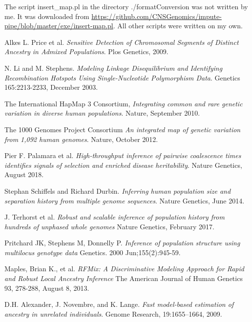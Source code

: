 \documentclass{article}
\begin{document}
The script insert\_map.pl in the directory ./formatConversion was not written by me. It was downloaded from \url{https://github.com/CNSGenomics/impute-pipe/blob/master/exe/insert-map.pl}. All other scripts were written on my own.

\begin{thebibliography}{9}
Alkes L. Price et al.
\textit{Sensitive Detection of Chromosomal Segments of Distinct Ancestry in Admixed Populations}. 
Plos Genetics, 2009.
 
N. Li and M. Stephens. 
\textit{Modeling Linkage Disequilibrium and Identifying Recombination Hotspots Using Single-Nucleotide Polymorphism Data}.
Genetics 165:2213-2233, December 2003.
 
The International HapMap 3 Consortium,
\textit{Integrating common and rare genetic variation in diverse human populations}.
Nature, September 2010.


The 1000 Genomes Project Consortium
\textit{An integrated map of genetic variation from 1,092 human genomes}.
Nature, October 2012.

Pier F. Palamara et al.
\textit{High-throughput inference of pairwise coalescence times identifies signals of selection and enriched disease heritability}.
Nature Genetics, August 2018.

Stephan Schiffels and Richard Durbin. 
\textit{Inferring human population size and separation history from multiple genome sequences}.
Nature Genetics, June 2014.

J. Terhorst et al. 
\textit{Robust and scalable inference of population history from hundreds of unphased whole genomes}
Nature Genetics, February 2017.

Pritchard JK, Stephens M, Donnelly P.
\textit{Inference of population structure using multilocus genotype data}
Genetics. 2000 Jun;155(2):945-59.

Maples, Brian K., et al.
\textit{RFMix: A Discriminative Modeling Approach for Rapid and Robust Local Ancestry Inference}
The American Journal of Human Genetics 93, 278-288, August 8, 2013.

D.H. Alexander, J. Novembre, and K. Lange.
\textit{Fast model-based estimation of ancestry in unrelated individuals}. 
Genome Research, 19:1655–1664, 2009.

\end{thebibliography}
\end{document}
